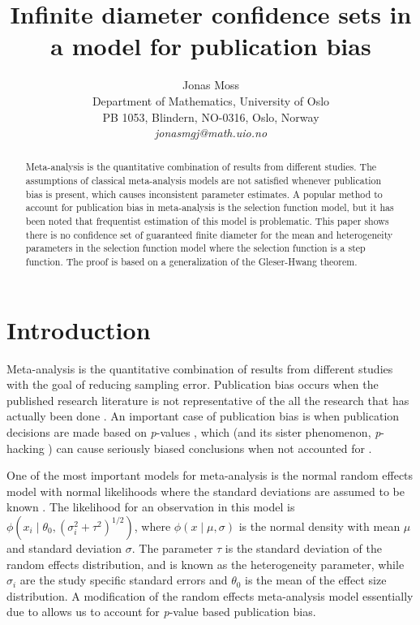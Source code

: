 \documentclass[twoside]{article}
\title{Infinite diameter confidence sets in a model for publication bias}
\author{
  Jonas Moss \orcid{0000-0002-6876-6964} \\
  Department of Mathematics, University of Oslo\\
  PB 1053, Blindern, NO-0316, Oslo, Norway \\
  \it{jonasmgj@math.uio.no}
}
\begin{document}
\maketitle
\begin{abstract}
Meta-analysis is the quantitative combination of results from different studies. The assumptions of classical meta-analysis models are not satisfied whenever publication bias is present, which causes inconsistent parameter estimates. A popular method to account for publication bias in meta-analysis is the selection function model, but it has been noted that frequentist estimation of this model is problematic. This paper shows there is no confidence set of guaranteed finite diameter for the mean and heterogeneity parameters in the selection function model where the selection function is a step function. The proof is based on a generalization of the Gleser-Hwang theorem.
\end{abstract}

\section{Introduction}

Meta-analysis is the quantitative combination of results from different studies \citep{lipsey2001practical} with the goal of reducing sampling error.
Publication bias occurs when the published research literature is
not representative of the all the research that has actually been
done \citep{rothstein2006publication}. An important case of publication
bias is when publication decisions are made based on \emph{p}-values
\citep{sterling1959publication}, which (and its sister phenomenon, \emph{p}-hacking \citep{simmons2011false})
can cause seriously biased conclusions when not accounted
for \citep{simmons2011false,moss2019modelling}.

One of the most important models for meta-analysis is the normal random effects
model with normal likelihoods where the
standard deviations are assumed to be known \citep{hedges1998fixed}.
The likelihood for an observation in this model is $\phi(x_{i}\mid\theta_{0},(\sigma_{i}^{2}+\tau^{2})^{1/2})$,
where $\phi(x\mid\mu,\sigma)$ is the normal density with
mean $\mu$ and standard deviation $\sigma$. The parameter $\tau$ is the standard deviation of the random effects distribution, and is known as the heterogeneity parameter, while $\sigma_i$ are the study specific standard errors and $\theta_0$ is the mean of the effect size distribution. A modification of the random
effects meta-analysis model essentially due to \citet{hedges1984estimation}
allows us to account for \emph{p}-value based publication bias.
\end{document}
